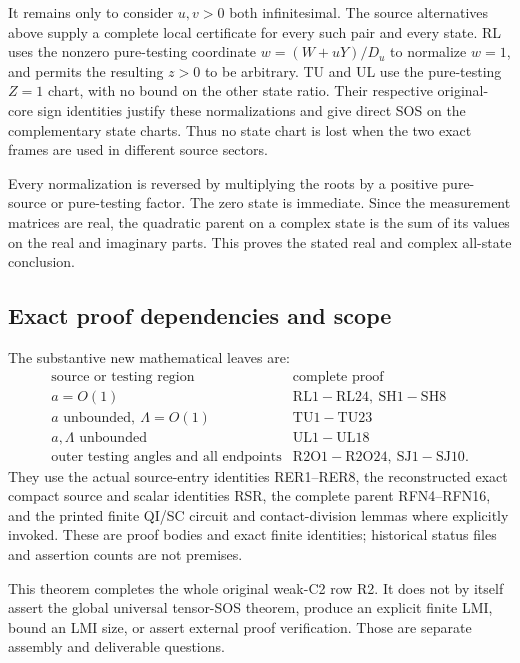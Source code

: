 It remains only to consider \(u,v>0\) both infinitesimal.
The source alternatives above supply a complete local certificate
for every such pair and every state.  RL uses the nonzero
pure-testing coordinate \(w=(W+uY)/D_u\) to normalize
\(w=1\), and permits the resulting \(z>0\) to be arbitrary.
TU and UL use the pure-testing \(Z=1\) chart, with no bound on
the other state ratio.  Their respective original-core sign
identities justify these normalizations and give direct SOS
on the complementary state charts.  Thus no state chart is
lost when the two exact frames are used in different source
sectors.

Every normalization is reversed by multiplying the roots by
a positive pure-source or pure-testing factor.  The zero
state is immediate.  Since the measurement matrices are real,
the quadratic parent on a complex state is the sum of its
values on the real and imaginary parts.  This proves the
stated real and complex all-state conclusion.

\subsection{Exact proof dependencies and scope}

The substantive new mathematical leaves are:
\[
\begin{array}{c|l}
 \text{source or testing region}&\text{complete proof}\\ \hline
 a=O(1)&\mathrm{RL1\!-\!RL24,\ SH1\!-\!SH8}\\
 a\text{ unbounded},\ \Lambda=O(1)&\mathrm{TU1\!-\!TU23}\\
 a,\Lambda\text{ unbounded}&\mathrm{UL1\!-\!UL18}\\
 \text{outer testing angles and all endpoints}&
                   \mathrm{R2O1\!-\!R2O24,\ SJ1\!-\!SJ10}.
\end{array}                                                     \tag{R2A4}
\]
They use the actual source-entry identities RER1--RER8,
the reconstructed exact compact source and scalar identities
RSR, the complete parent RFN4--RFN16, and the printed finite
QI/SC circuit and contact-division lemmas where explicitly
invoked.  These are proof bodies and exact finite identities;
historical status files and assertion counts are not premises.

This theorem completes the whole original weak-C2 row R2.
It does not by itself assert the global universal tensor-SOS
theorem, produce an explicit finite LMI, bound an LMI size,
or assert external proof verification.  Those are separate
assembly and deliverable questions.
